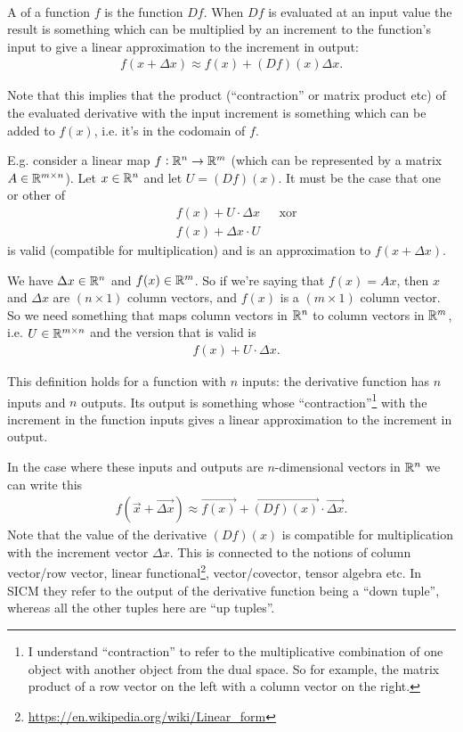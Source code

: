 \begin{definition*}~\\
  A  of a function $f$ is the function $D f$. When $D f$ is evaluated at an input
  value the result is something which can be multiplied by an increment to the function's input to
  give a linear approximation to the increment in output:
  \begin{align*}
    f(x + \Delta x) \approx f(x) + (D f)(x)\Delta x.
  \end{align*}

  Note that this implies that the product (``contraction'' or matrix product etc) of the evaluated
  derivative with the input increment is something which can be added to $f(x)$, i.e. it's in the
  codomain of $f$.

  E.g. consider a linear map $f:\mathbb{R}^n \to \mathbb{R}^m$ (which can be represented by a matrix
  $A \in \mathbb{R}^{m \times n}$). Let $x \in \mathbb{R}^n$ and let $U = (D f)(x)$. It must be the case that one or
  other of
  \begin{align*}
    &f(x) + U \cdot \Delta x ~~~~~~~\text{xor} \\
    &f(x) + \Delta x \cdot U
  \end{align*}
  is valid (compatible for multiplication) and is an approximation to $f(x + \Delta x)$.

  We have $\Delta x \in \mathbb{R}^n$ and $f(x) \in \mathbb{R}^m$. So if we're saying that $f(x) = Ax$, then $x$ and
  $\Delta x$ are $(n \times 1)$ column vectors, and $f(x)$ is a $(m \times 1)$ column vector. So we
  need something that maps column vectors in $\mathbb{R}^n$ to column vectors in $\mathbb{R}^m$, i.e.
  $U \in \mathbb{R}^{m \times n}$ and the version that is valid is
  \begin{align*}
    &f(x) + U \cdot \Delta x.
  \end{align*}

  This definition holds for a function with $n$ inputs: the derivative function has $n$ inputs and
  $n$ outputs. Its output is something whose ``contraction''\footnote{I understand ``contraction''
    to refer to the multiplicative combination of one object with another object from the dual
    space. So for example, the matrix product of a row vector on the left with a column vector on
    the right.} with the increment in the function inputs gives a linear approximation to the
  increment in output.

  In the case where these inputs and outputs are $n$-dimensional vectors in $\mathbb{R}^n$ we can write this
  \begin{align*}
    f(\overrightarrow{x} + \overrightarrow{\Delta x}) \approx \overrightarrow{f(x)} + \overrightarrow{(D f)(x)} \cdot \overrightarrow{\Delta x}.
  \end{align*}
  Note that the value of the derivative $(D f)(x)$ is compatible for multiplication with the
  increment vector $\Delta x$. This is connected to the notions of column vector/row vector, linear
  functional\footnote{\url{https://en.wikipedia.org/wiki/Linear_form}}, vector/covector, tensor
  algebra etc. In SICM they refer to the output of the derivative function being a ``down tuple'',
  whereas all the other tuples here are ``up tuples''.


\end{definition*}
